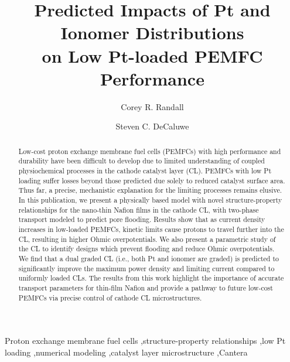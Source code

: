 \documentclass[final,3p,times,twocolumn]{elsarticle}    %
\begin{document}
\begin{frontmatter}

\title{Predicted Impacts of Pt and Ionomer Distributions \\ 
       on Low Pt-loaded PEMFC Performance}

\author[CSM]{Corey R. Randall}
\author[CSM]{Steven C. DeCaluwe }
        
\address[CSM]{Colorado School of Mines, 1500 Illinois St, Golden, CO 80401}

\begin{abstract} 
Low-cost proton exchange membrane fuel cells (PEMFCs) with high performance and durability have been difficult to develop due to limited understanding of coupled physiochemical processes in the cathode catalyst layer (CL). PEMFCs with low Pt loading suffer losses beyond those predicted due solely to reduced catalyst surface area. Thus far, a precise, mechanistic explanation for the limiting processes remains elusive. In this publication, we present a physically based model with novel structure-property relationships for the nano-thin Nafion films in the cathode CL, with two-phase transport modeled to predict pore flooding. Results show that as current density increases in low-loaded PEMFCs, kinetic limits cause protons to travel further into the CL, resulting in higher Ohmic overpotentials. We also present a parametric study of the CL to identify designs which prevent flooding and reduce Ohmic overpotentials. We find that a dual graded CL (i.e., both Pt and ionomer are graded) is predicted to significantly improve the maximum power density and limiting current compared to uniformly loaded CLs. The results from this work highlight the importance of accurate transport parameters for thin-film Nafion and provide a pathway to future low-cost PEMFCs via precise control of cathode CL microstructures.
\end{abstract}

\begin{keyword}
Proton exchange membrane fuel cells \sep structure-property relationships \sep low Pt loading \sep numerical modeling \sep catalyst layer microstructure \sep Cantera
\end{keyword}

\end{frontmatter}
\end{document}
